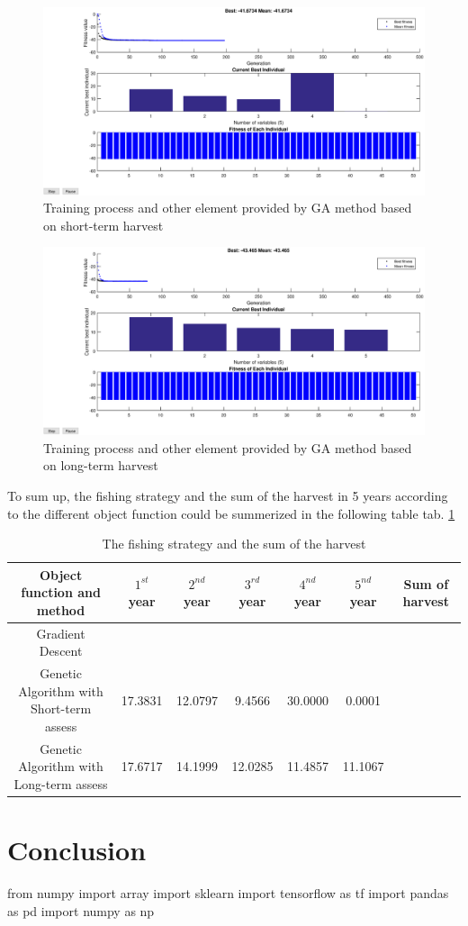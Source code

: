 \documentclass{IEEEtran}
\begin{document}
\begin{figure}[h]
    \includegraphics[width=\columnwidth]{1GA.eps}
\caption{Training process and other element provided by GA method based on short-term harvest}
    \label{fig1}
\end{figure}
\begin{figure}[h]
    \includegraphics[width=\columnwidth]{2GA.eps}
    \caption{Training process and other element provided by GA method based on long-term harvest}
    \label{fig2}
\end{figure}

To sum up, the fishing strategy and the sum of the harvest in 5 years according to the different object function could be summerized in the following table tab. \ref{tab1}

\begin{table}[!t]
    \normalsize
    \caption{The fishing strategy and the sum of the harvest}
    \label{tab1}
    \begin{tabular}{|c|c|c|c|c|c|c|}\hline
        Object function and method & $1^{st}$ year & $2^{nd}$ year & $3^{rd}$ year & $4^{nd}$ year & $5^{nd}$ year & Sum of harvest \\ 
        \hline
        Gradient Descent & & & & & &\\ \hline
        Genetic Algorithm with Short-term assess & 17.3831 & 12.0797 & 9.4566 & 30.0000 & 0.0001 & \\ \hline
        Genetic Algorithm with Long-term assess & 17.6717 & 14.1999 & 12.0285 & 11.4857 & 11.1067 & \\ \hline
    \end{tabular}
\vspace*{4pt} 
\end{table}

\section{Conclusion}
from numpy import array 
import sklearn
import tensorflow as tf
import pandas as pd
import numpy as np
\end{document}
